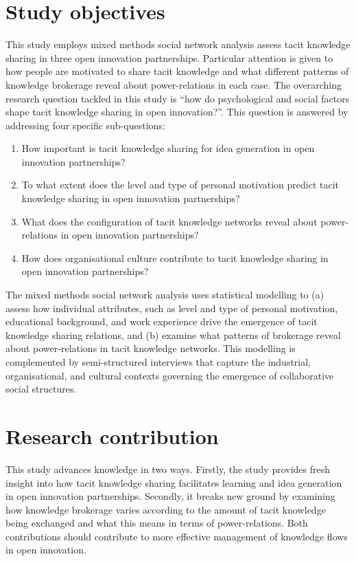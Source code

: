 \section{Study objectives}

This study employs mixed methods social network analysis assess tacit knowledge sharing in three open innovation partnerships. Particular attention is given to how people are motivated to share tacit knowledge and what different patterns of knowledge brokerage reveal about power-relations in each case. The overarching research question tackled in this study is \enquote{how do psychological and social factors shape tacit knowledge sharing in open innovation?}. This question is answered by addressing four specific sub-questions: \medskip

\begin{enumerate}
	\item How important is tacit knowledge sharing for idea generation in open innovation partnerships?
	\item To what extent does the level and type of personal motivation predict tacit knowledge sharing in open innovation partnerships?
	\item What does the configuration of tacit knowledge networks reveal about power-relations in open innovation partnerships?
	\item How does organisational culture contribute to tacit knowledge sharing in open innovation partnerships?
\end{enumerate}

The mixed methods social network analysis uses statistical modelling to (a) assess how individual attributes, such as level and type of personal motivation, educational background, and work experience drive the emergence of tacit knowledge sharing relations, and (b) examine what patterns of brokerage reveal about power-relations in tacit knowledge networks. This modelling is complemented by semi-structured interviews that capture the industrial, organisational, and cultural contexts governing the emergence of collaborative social structures. \medskip  

\section{Research contribution}

This study advances knowledge in two ways. Firstly, the study provides fresh insight into how tacit knowledge sharing facilitates learning and idea generation in open innovation partnerships. Secondly, it breaks new ground by examining how knowledge brokerage varies according to the amount of tacit knowledge being exchanged and what this means in terms of power-relations. Both contributions should contribute to more effective management of knowledge flows in open innovation. \medskip


